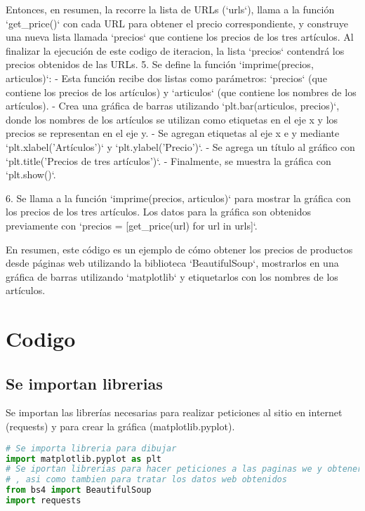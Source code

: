 \documentclass[12pt]{article}
\begin{document}
	Entonces, en resumen, la  recorre la lista de URLs (`urls`), llama a la función `get\_price()` con cada URL para obtener el precio correspondiente, y construye una nueva lista llamada `precios` que contiene los precios de los tres artículos. Al finalizar la ejecución de este codigo de iteracion, la lista `precios` contendrá los precios obtenidos de las URLs.
	5. Se define la función `imprime(precios, articulos)`:
	- Esta función recibe dos listas como parámetros: `precios` (que contiene los precios de los artículos) y `articulos` (que contiene los nombres de los artículos).
	- Crea una gráfica de barras utilizando `plt.bar(articulos, precios)`, donde los nombres de los artículos se utilizan como etiquetas en el eje x y los precios se representan en el eje y.
	- Se agregan etiquetas al eje x e y mediante `plt.xlabel('Artículos')` y `plt.ylabel('Precio')`.
	- Se agrega un título al gráfico con `plt.title('Precios de tres artículos')`.
	- Finalmente, se muestra la gráfica con `plt.show()`.
	
	6. Se llama a la función `imprime(precios, articulos)` para mostrar la gráfica con los precios de los tres artículos. Los datos para la gráfica son obtenidos previamente con `precios = [get\_price(url) for url in urls]`.
	
	En resumen, este código es un ejemplo de cómo obtener los precios de productos desde páginas web utilizando la biblioteca `BeautifulSoup`, mostrarlos en una gráfica de barras utilizando `matplotlib` y etiquetarlos con los nombres de los artículos.
	
	\section{Codigo}
	\subsection{Se importan librerias}
Se importan las librerías necesarias para realizar peticiones al sitio en internet (requests) y para crear la gráfica (matplotlib.pyplot).
\begin{lstlisting}[language=Python]
# Se importa libreria para dibujar
import matplotlib.pyplot as plt
# Se iportan librerias para hacer peticiones a las paginas we y obtener su codigo
# , asi como tambien para tratar los datos web obtenidos
from bs4 import BeautifulSoup
import requests
\end{lstlisting}	
\end{document}
